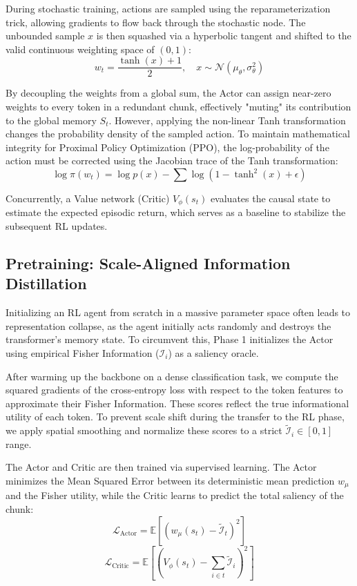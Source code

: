 During stochastic training, actions are sampled using the reparameterization trick, allowing gradients to flow back through the stochastic node. The unbounded sample $x$ is then squashed via a hyperbolic tangent and shifted to the valid continuous weighting space of $(0, 1)$:
$$ w_t = \frac{\tanh(x) + 1}{2}, \quad x \sim \mathcal{N}(\mu_\theta, \sigma_\theta^2) $$

By decoupling the weights from a global sum, the Actor can assign near-zero weights to every token in a redundant chunk, effectively "muting" its contribution to the global memory $S_t$. However, applying the non-linear Tanh transformation changes the probability density of the sampled action. To maintain mathematical integrity for Proximal Policy Optimization (PPO), the log-probability of the action must be corrected using the Jacobian trace of the Tanh transformation:
$$ \log \pi(w_t) = \log p(x) - \sum \log(1 - \tanh^2(x) + \epsilon) $$

Concurrently, a Value network (Critic) $V_\phi(s_t)$ evaluates the causal state to estimate the expected episodic return, which serves as a baseline to stabilize the subsequent RL updates.

\subsection{Pretraining: Scale-Aligned Information Distillation}
Initializing an RL agent from scratch in a massive parameter space often leads to representation collapse, as the agent initially acts randomly and destroys the transformer's memory state. To circumvent this, Phase 1 initializes the Actor using empirical Fisher Information ($\mathcal{I}_i$) as a saliency oracle. 

After warming up the backbone on a dense classification task, we compute the squared gradients of the cross-entropy loss with respect to the token features to approximate their Fisher Information. These scores reflect the true informational utility of each token. To prevent scale shift during the transfer to the RL phase, we apply spatial smoothing and normalize these scores to a strict $\tilde{\mathcal{I}}_i \in [0, 1]$ range.

The Actor and Critic are then trained via supervised learning. The Actor minimizes the Mean Squared Error between its deterministic mean prediction $w_{\mu}$ and the Fisher utility, while the Critic learns to predict the total saliency of the chunk:
$$ \mathcal{L}_{\text{Actor}} = \mathbb{E} \left[ \left( w_{\mu}(s_t) - \tilde{\mathcal{I}}_t \right)^2 \right] $$
$$ \mathcal{L}_{\text{Critic}} = \mathbb{E} \left[ \left( V_\phi(s_t) - \sum_{i \in t} \tilde{\mathcal{I}}_i \right)^2 \right] $$


